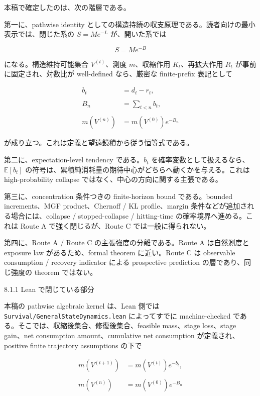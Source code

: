 \documentclass[12pt,a4paper]{article}
\begin{document}
本稿で確定したのは、次の階層である。

第一に、pathwise identity としての構造持続の収支原理である。読者向けの最小表示では、閉じた系の \(S=Me^{-L}\) が、開いた系では

\[
S = M e^{-B}
\]

になる。構造維持可能集合 \(V^{(t)}\)、測度 \(m\)、収縮作用 \(K_{t}\)、再拡大作用 \(R_{t}\) が事前に固定され、対数比が well-defined なら、厳密な finite-prefix 表記として

\[
\begin{aligned}
b_{t}&=d_{t}-r_{t}, \\
\qquad \\
B_{n}&=\sum_{t<n}b_{t}, \\
\qquad \\
m(V^{(n)})&=m(V^{(0)})e^{-B_{n}}
\end{aligned}
\]

が成り立つ。これは定義と望遠鏡積から従う恒等式である。

第二に、expectation-level tendency である。\(b_{t}\) を確率変数として扱えるなら、\(\mathbb E[b_{t}]\) の符号は、累積純消耗量の期待中心がどちらへ動くかを与える。これは high-probability collapse ではなく、中心の方向に関する主張である。

第三に、concentration 条件つきの finite-horizon bound である。bounded increments、MGF product、Chernoff / KL profile、margin 条件などが追加される場合には、collapse / stopped-collapse / hitting-time の確率境界へ進める。これは Route A で強く閉じるが、Route C では一般に得られない。

第四に、Route A / Route C の主張強度の分離である。Route A は自然測度と exposure law があるため、formal theorem に近い。Route C は observable consumption / recovery indicator による prospective prediction の層であり、同じ強度の theorem ではない。

8.1.1 Lean で閉じている部分

本稿の pathwise algebraic kernel は、Lean 側では \texttt{Survival/GeneralStateDynamics.lean} によってすでに machine-checked である。そこでは、収縮後集合、修復後集合、feasible mass、stage loss、stage gain、net consumption amount、cumulative net consumption が定義され、positive finite trajectory assumptions の下で

\[
\begin{aligned}
m(V^{(t+1)})&=m(V^{(t)})e^{-b_{t}}, \\
\qquad \\
m(V^{(n)})&=m(V^{(0)})e^{-B_{n}}
\end{aligned}
\]
\end{document}
